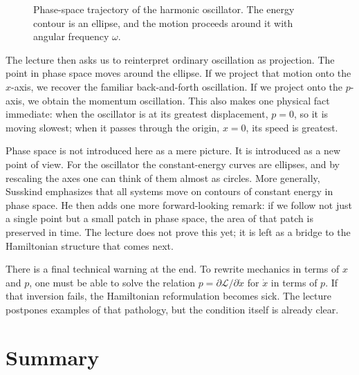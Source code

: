 \begin{figure}[h]
\centering
{}
\caption{Phase-space trajectory of the harmonic oscillator. The energy contour is an ellipse, and the motion proceeds around it with angular frequency \(\omega\).}
\end{figure}

The lecture then asks us to reinterpret ordinary oscillation as projection. The point in phase space moves around the ellipse. If we project that motion onto the \(x\)-axis, we recover the familiar back-and-forth oscillation. If we project onto the \(p\)-axis, we obtain the momentum oscillation. This also makes one physical fact immediate: when the oscillator is at its greatest displacement, \(p=0\), so it is moving slowest; when it passes through the origin, \(x=0\), its speed is greatest.

Phase space is not introduced here as a mere picture. It is introduced as a new point of view. For the oscillator the constant-energy curves are ellipses, and by rescaling the axes one can think of them almost as circles. More generally, Susskind emphasizes that all systems move on contours of constant energy in phase space. He then adds one more forward-looking remark: if we follow not just a single point but a small patch in phase space, the area of that patch is preserved in time. The lecture does not prove this yet; it is left as a bridge to the Hamiltonian structure that comes next.

There is a final technical warning at the end. To rewrite mechanics in terms of \(x\) and \(p\), one must be able to solve the relation \(p=\partial\mathcal{L}/\partial\dot x\) for \(\dot x\) in terms of \(p\). If that inversion fails, the Hamiltonian reformulation becomes sick. The lecture postpones examples of that pathology, but the condition itself is already clear.

\section{Summary}

